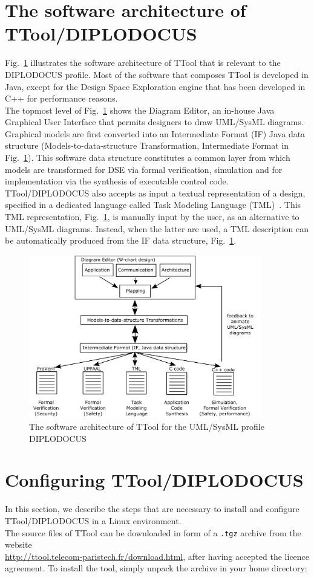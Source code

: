 \documentclass{llncs}
\begin{document}
\section{The software architecture of TTool/DIPLODOCUS}
\label{sec:SwArch}
%
Fig.~\ref{fig:TToolSWArch} illustrates the software architecture of TTool that is relevant to the DIPLODOCUS profile.
Most of the software that composes TTool is developed in Java, except for the Design Space Exploration engine that has
been developed in C++ for performance reasons.\\
%
The topmost level of Fig.~\ref{fig:TToolSWArch} shows the Diagram Editor, an in-house Java Graphical User
Interface that permits designers to draw UML/SysML diagrams. Graphical models are first converted into an Intermediate
Format (IF) Java data structure (Models-to-data-structure Transformation, Intermediate Format in
Fig.~\ref{fig:TToolSWArch}). This software data structure constitutes a common layer from which models are transformed
for DSE via formal verification, simulation and for implementation via the synthesis of executable control code.\\
%
TTool/DIPLODOCUS also accepts as input a textual representation of a design, specified in a dedicated language called
Task Modeling Language (TML)~\cite{Waseem06}. This TML representation, Fig.~\ref{fig:TToolSWArch}, is manually input by
the user, as an alternative to UML/SysML diagrams. Instead, when the latter are used, a TML description can be
automatically produced from the IF data structure, Fig.~\ref{fig:TToolSWArch}.
%
\begin{figure}[!htbp]
	\centering
	\includegraphics[width=4in]{figures/TToolSWArch.pdf}
	\caption{The software architecture of TTool for the UML/SysML profile DIPLODOCUS}
	\label{fig:TToolSWArch}
\end{figure}
%
%
%
\newpage
\section{Configuring TTool/DIPLODOCUS}
\label{sec:Config}
%
In this section, we describe the steps that are necessary to install and configure TTool/DIPLODOCUS in a Linux
environment.\\
%
The source files of TTool can be downloaded in form of a \texttt{.tgz} archive from the website\\
\url{http://ttool.telecom-paristech.fr/download.html}, after having accepted the
licence agreement. To install the tool, simply unpack the archive in your home directory:\\
%
\end{document}
